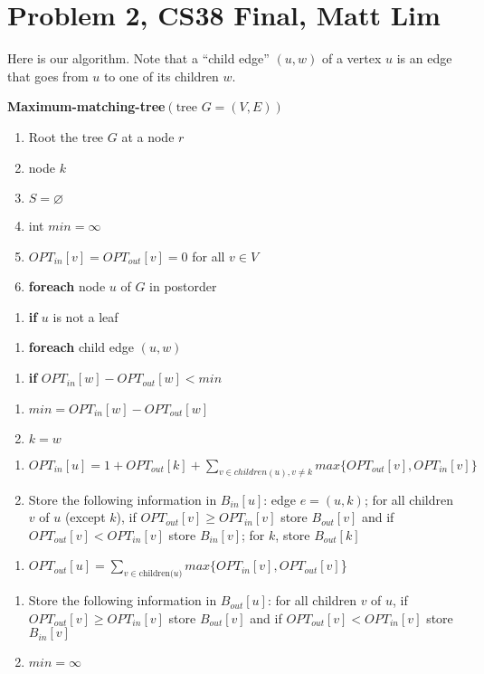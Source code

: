 \documentclass{article}
\newcommand{\modifyenum}[1]{%
  \end{enumerate}
  \begin{enumerate}[resume,#1]
}
\begin{document}
\section*{Problem 2, CS38 Final, Matt Lim}
Here is our algorithm. Note that a ``child edge'' $(u,w)$ of a vertex $u$ is an edge
that goes from $u$ to one of its children $w$.

\vspace{5mm}

\textbf{Maximum-matching-tree}$(\text{tree } G = (V,E))$
\begin{enumerate}
    \item Root the tree $G$ at a node $r$
    \item node $k$
    \item $S = \varnothing$
    \item int $min = \infty$
    \item $OPT_{in}[v] = OPT_{out}[v] = 0$ for all $v \in V$
    \item \textbf{foreach} node $u$ of $G$ in postorder
    \modifyenum{leftmargin=50pt}
    \item \textbf{if} $u$ is not a leaf
    \modifyenum{leftmargin=75pt}
    \item \textbf{foreach} child edge $(u,w)$
    \modifyenum{leftmargin=100pt}
    \item \textbf{if} $OPT_{in}[w] - OPT_{out}[w] < min$
    \modifyenum{leftmargin=125pt}
    \item $min = OPT_{in}[w] - OPT_{out}[w]$
    \item $k = w$
    \modifyenum{leftmargin=75pt}
    \item $OPT_{in}[u] = 1 + OPT_{out}[k] + \sum_{v \in children(u), v \neq k}
    max\{OPT_{out}[v], OPT_{in}[v]\}$
    \item Store the following information in
        $B_{in}[u]$: edge $e = (u,k)$; for all children $v$ of $u$ (except $k$),
        if $OPT_{out}[v] \geq OPT_{in}[v]$ store $B_{out}[v]$ and
        if $OPT_{out}[v] < OPT_{in}[v]$ store $B_{in}[v]$; for $k$, store
        $B_{out}[k]$
    \modifyenum{leftmargin=75pt}
    \item $OPT_{out}[u] =
        \sum_{v \in \text{children($u$)}} max\{OPT_{in}[v], OPT_{out}[v]$\}
    \modifyenum{leftmargin=75pt}
    \item Store the following information in
        $B_{out}[u]$: for all children $v$ of $u$,
        if $OPT_{out}[v] \geq OPT_{in}[v]$ store $B_{out}[v]$ and
        if $OPT_{out}[v] < OPT_{in}[v]$ store $B_{in}[v]$
    \item $min = \infty$

\end{enumerate}
\end{document}
